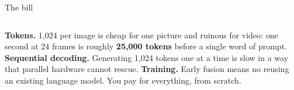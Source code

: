 \documentclass[aspectratio=169]{beamer}
\begin{document}
\begin{frame}{The bill}
  \small
  \begin{columns}[T]
    \footnotesize
    \textbf{Tokens.} 1,024 per image is cheap for one picture and ruinous for video: one
    second at 24 frames is roughly \textbf{25,000 tokens} before a single word of prompt.
    \vskip 6pt
    \textbf{Sequential decoding.} Generating 1,024 tokens one at a time is slow in a way
    that parallel hardware cannot rescue.
    \vskip 6pt
    \textbf{Training.} Early fusion means no reusing an existing language model. You pay for
    everything, from scratch.
  \end{columns}
\end{frame}
\end{document}
